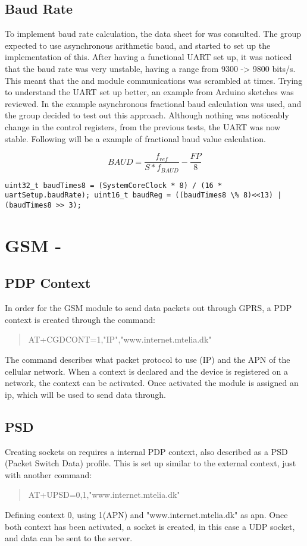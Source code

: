 \subsection{Baud Rate}
To implement baud rate calculation, the data sheet for \SAMD was consulted. The group expected to use asynchronous arithmetic baud, and started to set up the implementation of this. After having a functional UART set up, it was noticed that the baud rate was very unstable, having a range from 9300 -> 9800 bits/s. This meant that the \GPS and \SARA module communications was scrambled at times. 
Trying to understand the UART set up better, an example from Arduino sketches was reviewed. In the example asynchronous fractional baud calculation was used, and the group decided to test out this approach. Although nothing was noticeably change in the control registers, from the previous tests, the UART was now stable.
Following will be a example of fractional baud value calculation.

\[BAUD = \frac{f_{ref}}{S*f_{BAUD}} - \frac{FP}{8}\]
\begin{verbatim}	
uint32_t baudTimes8 = (SystemCoreClock * 8) / (16 * uartSetup.baudRate); uint16_t baudReg = ((baudTimes8 \% 8)<<13) | (baudTimes8 >> 3);	
\end{verbatim}

\section{GSM - \SARA}
\subsection{PDP Context}
In order for the GSM module to send data packets out through GPRS, a PDP context is created through the command:
\begin{quote}
	AT+CGDCONT=1,"IP","www.internet.mtelia.dk"
\end{quote}

The command describes what packet protocol to use (IP) and the APN of the cellular network. When a context is declared and the device is registered on a network, the context can be activated. Once activated the module is assigned an ip, which will be used to send data through.

\subsection{PSD}
Creating sockets on \SARA requires a internal PDP context, also described as a PSD (Packet Switch Data) profile. This is set up similar to the external context, just with another command:
\begin{quote}
	AT+UPSD=0,1,"www.internet.mtelia.dk"
\end{quote}
Defining context 0, using 1(APN) and "www.internet.mtelia.dk" as apn. Once both context has been activated, a socket is created, in this case a UDP socket, and data can be sent to the server.